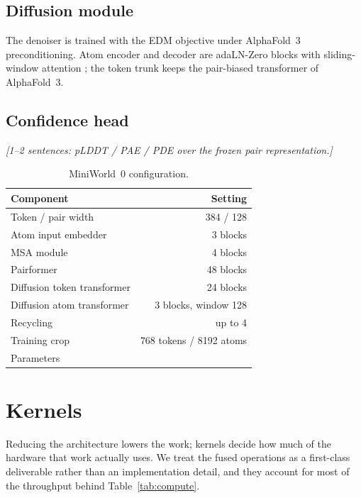 \documentclass[11pt]{article}
\newcommand{\todo}[1]{{\color{draft}\itshape\small[#1]}}
\newcommand{\mw}{MiniWorld~0}
\begin{document}
\subsection{Diffusion module}
The denoiser is trained with the EDM objective \citep{edm} under AlphaFold~3
preconditioning. Atom encoder and decoder are adaLN-Zero blocks \citep{dit}
with sliding-window attention \citep[Alg.~8]{esmfold2}; the token trunk keeps
the pair-biased transformer of AlphaFold~3.

\subsection{Confidence head}
\todo{1--2 sentences: pLDDT / PAE / PDE over the frozen pair representation.}

\begin{table}[t]
\centering\small\sffamily
\caption{\normalfont\rmfamily \mw{} configuration.}
\label{tab:config}
\begin{tabularx}{\linewidth}{@{}Xr@{}}
\toprule
\rmfamily Component & \rmfamily Setting \\
\midrule
Token / pair width                    & 384 / 128 \\
Atom input embedder                   & 3 blocks \\
MSA module                            & 4 blocks \\
Pairformer                            & 48 blocks \\
Diffusion token transformer           & 24 blocks \\
Diffusion atom transformer            & 3 blocks, window 128 \\
Recycling                             & up to 4 \\
Training crop                         & 768 tokens / 8192 atoms \\
Parameters                            & \rmfamily\todo{count} \\
\bottomrule
\end{tabularx}
\end{table}

\section{Kernels}
\label{sec:kernels}
Reducing the architecture lowers the work; kernels decide how much of the
hardware that work actually uses. We treat the fused operations as a
first-class deliverable rather than an implementation detail, and they account
for most of the throughput behind Table~\ref{tab:compute}.
\end{document}
